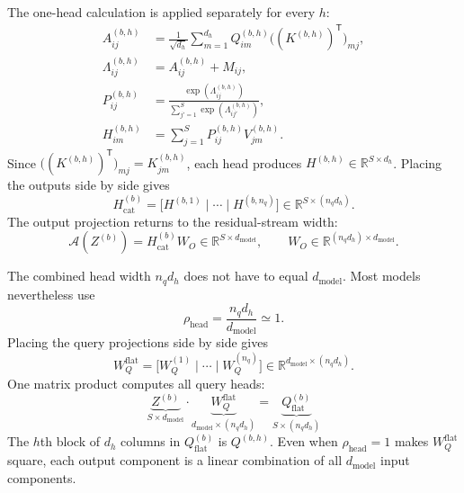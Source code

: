\documentclass[11pt]{article}
\newcommand{\R}{\mathbb{R}}
\begin{document}
The one-head calculation is applied separately for every $h$:
\begin{align}
  A_{ij}^{(b,h)}
  &=\frac{1}{\sqrt{d_h}}
    \sum_{m=1}^{d_h}Q_{im}^{(b,h)}
    \bigl((K^{(b,h)})^{\mathsf T}\bigr)_{mj},
  \label{eq:attention-score}\\
  \Lambda_{ij}^{(b,h)}
  &=A_{ij}^{(b,h)}+M_{ij},
  \label{eq:attention-logit}\\
  P_{ij}^{(b,h)}
  &=\frac{\exp(\Lambda_{ij}^{(b,h)})}
    {\sum_{j'=1}^{S}\exp(\Lambda_{ij'}^{(b,h)})},
  \label{eq:attention-probability}\\
  H_{im}^{(b,h)}
  &=\sum_{j=1}^{S}P_{ij}^{(b,h)}V_{jm}^{(b,h)}.
  \label{eq:attention}
\end{align}
Since $\bigl((K^{(b,h)})^{\mathsf T}\bigr)_{mj}=K_{jm}^{(b,h)}$, each head
produces $H^{(b,h)}\in\R^{S\times d_h}$.  Placing the outputs side by side gives
\begin{equation}
  H_{\mathrm{cat}}^{(b)}
  =\bigl[H^{(b,1)}\mid\cdots\mid H^{(b,n_q)}\bigr]
  \in\R^{S\times(n_qd_h)}.
\end{equation}
The output projection returns to the residual-stream width:
\begin{equation}
  \mathcal{A}(Z^{(b)})=H_{\mathrm{cat}}^{(b)}W_O
  \in\R^{S\times d_{\mathrm{model}}},
  \qquad
  W_O\in\R^{(n_qd_h)\times d_{\mathrm{model}}}.
\end{equation}

The combined head width $n_qd_h$ does not have to equal
$d_{\mathrm{model}}$.  Most models nevertheless use
\begin{equation}
  \rho_{\mathrm{head}}=\frac{n_qd_h}{d_{\mathrm{model}}}\simeq 1.
\end{equation}
Placing the query projections side by side gives
\[
  W_Q^{\mathrm{flat}}
  =\bigl[W_Q^{(1)}\mid\cdots\mid W_Q^{(n_q)}\bigr]
  \in\R^{d_{\mathrm{model}}\times(n_qd_h)}.
\]
One matrix product computes all query heads:
\begin{equation}
  \underbrace{Z^{(b)}}_{S\times d_{\mathrm{model}}}
  \cdot
  \underbrace{W_Q^{\mathrm{flat}}}_{d_{\mathrm{model}}\times(n_qd_h)}
  =
  \underbrace{Q_{\mathrm{flat}}^{(b)}}_{S\times(n_qd_h)}
  \label{eq:query-projection-reshape}
\end{equation}
The $h$th block of $d_h$ columns in $Q_{\mathrm{flat}}^{(b)}$ is
$Q^{(b,h)}$.  Even when $\rho_{\mathrm{head}}=1$ makes
$W_Q^{\mathrm{flat}}$ square, each output component is a linear combination of
all $d_{\mathrm{model}}$ input components.
\end{document}
